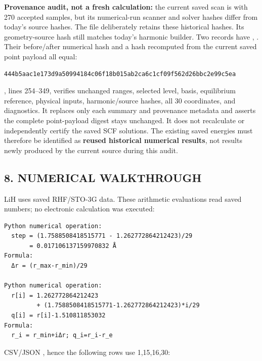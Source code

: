 \documentclass[10pt,a4paper]{article}
\begin{document}
\textbf{Provenance audit, not a fresh calculation:} the current saved scan is  with 270 accepted samples, but its numerical-run scanner and solver hashes differ from today's source hashes. The file deliberately retains these historical hashes. Its geometry-source hash still matches today's harmonic builder. Two  records have , . Their before/after numerical hash and a hash recomputed from the current saved point payload all equal:

\begin{Verbatim}
444b5aac1e173d9a50994184c06f18b015ab2ca6c1cf09f562d26bbc2e99c5ea
\end{Verbatim}
, lines 254–349, verifies unchanged ranges, selected level, basis, equilibrium reference, physical inputs, harmonic/source hashes, all 30 coordinates, and diagnostics. It replaces only each summary and provenance metadata and asserts the complete point-payload digest stays unchanged. It does not recalculate or independently certify the saved SCF solutions. The existing saved energies must therefore be identified as \textbf{reused historical numerical results}, not results newly produced by the current source during this audit.

\subsection{8. NUMERICAL WALKTHROUGH}
LiH uses saved RHF/STO-3G data. These arithmetic evaluations read saved numbers; no electronic calculation was executed:

\begin{Verbatim}
Python numerical operation:
  step = (1.7588508418515771 - 1.262772864212423)/29
       = 0.017106137159970832 Å
Formula:
  Δr = (r_max-r_min)/29

Python numerical operation:
  r[i] = 1.262772864212423
         + (1.7588508418515771-1.262772864212423)*i/29
  q[i] = r[i]-1.510811853032
Formula:
  r_i = r_min+iΔr; q_i=r_i-r_e
\end{Verbatim}
CSV/JSON , hence the following rows use 1,15,16,30:
\end{document}
